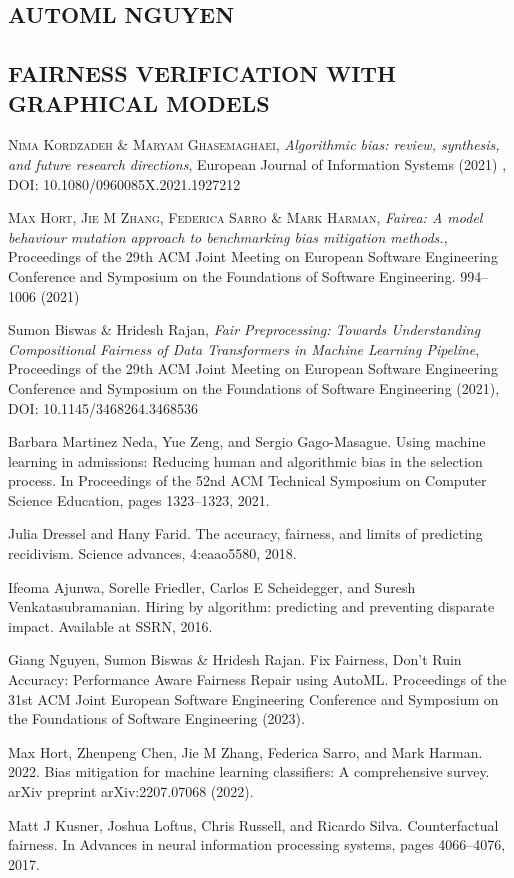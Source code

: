 \documentclass[12pt]{article}
\begin{document}
\subsection{AUTOML NGUYEN}

\subsection{FAIRNESS VERIFICATION WITH GRAPHICAL MODELS}




\begin{thebibliography}{xx}
 


\textsc{Nima Kordzadeh \& Maryam Ghasemaghaei}, \textit{Algorithmic bias: review, synthesis, and future research directions}, European Journal of Information Systems (2021) , DOI: 10.1080/0960085X.2021.1927212

\textsc{Max Hort, Jie M Zhang, Federica Sarro \& Mark Harman}, \textit{Fairea: A model behaviour mutation approach to benchmarking bias mitigation methods.}, Proceedings of the 29th ACM Joint Meeting on European Software Engineering Conference and Symposium on the Foundations of Software Engineering. 994–1006 (2021) 

\textsf{Sumon Biswas \& Hridesh Rajan}, \textit{Fair Preprocessing: Towards Understanding Compositional Fairness of Data Transformers in Machine Learning Pipeline}, Proceedings of the 29th ACM Joint Meeting on European Software Engineering Conference and Symposium on the Foundations of Software Engineering (2021), DOI: 10.1145/3468264.3468536

Barbara Martinez Neda, Yue Zeng, and Sergio Gago-Masague. Using machine learning in admissions: Reducing human and algorithmic bias in the selection process. In Proceedings of the 52nd ACM Technical Symposium on Computer Science Education, pages 1323–1323, 2021.

Julia Dressel and Hany Farid. The accuracy, fairness, and limits of predicting recidivism. Science advances, 4:eaao5580, 2018.

Ifeoma Ajunwa, Sorelle Friedler, Carlos E Scheidegger, and Suresh Venkatasubramanian. Hiring by algorithm: predicting and preventing disparate impact. Available at SSRN, 2016.

Giang Nguyen, Sumon Biswas \& Hridesh Rajan. Fix Fairness, Don’t Ruin Accuracy: Performance Aware Fairness Repair using AutoML. Proceedings of the 31st ACM Joint European Software Engineering Conference and Symposium on the Foundations of Software Engineering (2023). 

Max Hort, Zhenpeng Chen, Jie M Zhang, Federica Sarro, and Mark Harman. 2022. Bias mitigation for machine learning classifiers: A comprehensive survey. arXiv preprint arXiv:2207.07068 (2022).

Matt J Kusner, Joshua Loftus, Chris Russell, and Ricardo Silva. Counterfactual fairness. In Advances in neural information processing systems, pages 4066–4076, 2017.
\end{thebibliography}
\end{document}
